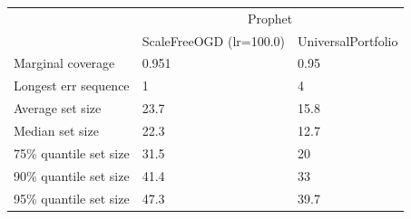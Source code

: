 \begin{tabular}{lll}
\toprule
& \multicolumn{2}{c}{Prophet} \\
& ScaleFreeOGD (lr=100.0) & UniversalPortfolio \\
\midrule
Marginal coverage & 0.951 & 0.95 \\
Longest err sequence & 1 & 4 \\
Average set size & 23.7 & 15.8 \\
Median set size & 22.3 & 12.7 \\
75\% quantile set size & 31.5 & 20 \\
90\% quantile set size & 41.4 & 33 \\
95\% quantile set size & 47.3 & 39.7 \\
\bottomrule
\end{tabular}
